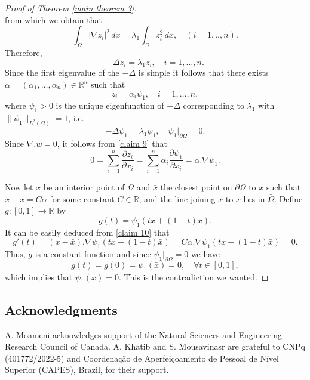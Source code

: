 \documentclass[reqno]{amsart}
\begin{document}
\begin{proof}[Proof of Theorem \ref{main theorem 3}]
\begin{equation}
\end{equation}
from which we obtain that
\[\int_{\Omega} |\nabla z_i|^2\,dx=\lambda_1{\int_\Omega  z_i^{2}\,dx},  \quad (i=1,..,n).\]
Therefore,
\begin{equation}\label{claim 8}
   -\Delta z_i  = \lambda_1 z_i,\quad i=1,\dots,n.
\end{equation}
Since the first eigenvalue of the $-\Delta$ is simple it  follows  that there exists
\(\alpha=(\alpha_1,\dots,\alpha_n) \in \mathbb{R}^n\) such that
\begin{equation}\label{claim 9}
    z_i  = \alpha_i \psi_1,\quad i=1,\dots,n,
\end{equation}
where \(\psi_1>0\) is the  unique eigenfunction of $-\Delta$ corresponding to
\(\lambda_1\) with \(\rVert\psi_1\rVert_{L^2(\Omega)}=1\), i.e.
\[
-\Delta \psi_1  = \lambda_1 \psi_1, \quad  \psi_1 |_{\partial \Omega}=0.
\]
Since \(\nabla.w=0\), it follows from \eqref{claim 9} that
\begin{equation}\label{claim 10}
   0=\sum_{i=1}^n \frac{\partial z_i}{\partial x_i}= \sum_{i=1}^n\alpha_i\frac{\partial \psi_1}{\partial x_i}=\alpha .\nabla\psi_1.
\end{equation}

Now let \(x\)  be an interior point of \(\Omega\) and \( \bar{x} \) the closest point
on \(\partial\Omega\) to \(x\) such that  \(\bar{x}-x=C\alpha\) for some constant
\(C\in \mathbb{R}\), and the line joining $x$ to $\bar x$ lies in $\bar \Omega$. Define
\( g : [0,1]\to\mathbb{R}\) by
\[
 g(t)=\psi_1(tx+(1-t)\bar{x}).
\]
It can be easily deduced from \eqref{claim 10} that
\[
  g'(t)=(x-\bar{x}).\nabla\psi_1(tx+(1-t)\bar{x})
  =C\alpha.\nabla\psi_1(tx+(1-t)\bar{x})=0.
\]
Thus, \(g\) is a constant function and since \(\psi_1 |_{\partial \Omega}=0\) we have
\[
g(t)= g(0)=\psi_1(\bar{x})=0,  \quad \forall t\in [0,1],
\]
which implies that \(\psi_1(x)=0 \). This is the contradiction we wanted.
\end{proof}

\subsection*{Acknowledgments}
A. Moameni acknowledges support of the Natural Sciences and Engineering Research 
Council of Canada.
A. Khatib and S. Mousavinasr are grateful to CNPq (401772/2022-5) and 
Coordena\c{c}\~ao de Aperfei\c{c}oamento de Pessoal de N\'ivel Superior (CAPES), 
Brazil, for their support.
\end{document}
